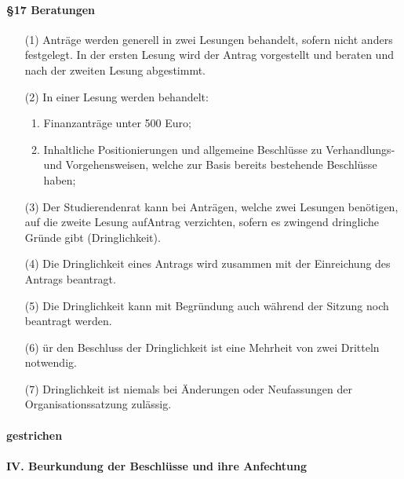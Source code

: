         \paragraph{§17 Beratungen}
            \begin{itemize}
                \item[(1)] Anträge werden generell in zwei Lesungen behandelt, sofern nicht anders festgelegt. In der ersten Lesung wird der Antrag vorgestellt und beraten und nach der zweiten Lesung abgestimmt.
                \item[(2)] In einer Lesung werden behandelt:
                    \begin{enumerate}
                        \item Finanzanträge unter 500 Euro;
                        \item Inhaltliche Positionierungen und allgemeine Beschlüsse zu Verhandlungs- und Vorgehensweisen, welche zur Basis bereits bestehende Beschlüsse haben;
                    \end{enumerate}
                \item[(3)] Der Studierendenrat kann bei Anträgen, welche zwei Lesungen  benötigen, auf die zweite Lesung aufAntrag verzichten, sofern es zwingend dringliche Gründe gibt (Dringlichkeit).
                \item[(4)] Die Dringlichkeit eines Antrags wird zusammen mit der Einreichung des Antrags beantragt.
                \item[(5)] Die Dringlichkeit kann mit Begründung auch während der Sitzung noch beantragt werden.
                \item[(6)] ür den Beschluss der Dringlichkeit ist eine Mehrheit von zwei Dritteln notwendig.
                \item[(7)] Dringlichkeit ist niemals bei Änderungen oder Neufassungen der Organisationssatzung zulässig.        
            \end{itemize}
        \paragraph{gestrichen}
    \paragraph{IV. Beurkundung der Beschlüsse und ihre Anfechtung}        
